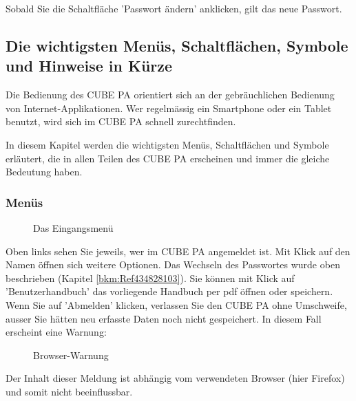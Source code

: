 Sobald Sie die Schaltfläche 'Passwort ändern' anklicken, gilt das neue Passwort.

\subsection{Die wichtigsten Menüs, Schaltflächen, Symbole und Hinweise in Kürze}

Die Bedienung des CUBE PA orientiert sich an der gebräuchlichen Bedienung von Internet-Applikationen. Wer regelmässig ein Smartphone oder ein Tablet benutzt, wird sich im CUBE PA schnell zurechtfinden.

\vspace{\baselineskip}

In diesem Kapitel werden die wichtigsten Menüs, Schaltflächen und Symbole erläutert, die in allen Teilen des CUBE PA erscheinen und immer die gleiche Bedeutung haben.

\subsubsection{Menüs}

\begin{figure}[H]
\caption{Das Eingangsmenü}
\end{figure}


Oben links sehen Sie jeweils, wer im CUBE PA angemeldet ist. Mit Klick auf den Namen öffnen sich weitere Optionen. Das Wechseln des Passwortes wurde oben beschrieben (Kapitel \ref{bkm:Ref434828103}). 
Sie können mit Klick auf 'Benutzerhandbuch' das vorliegende Handbuch per pdf öffnen oder speichern. Wenn Sie auf 'Abmelden' klicken, verlassen Sie den CUBE PA ohne Umschweife, ausser Sie hätten neu erfasste Daten noch nicht gespeichert. In diesem Fall erscheint eine Warnung:

\begin{figure}[H]
\caption{Browser-Warnung}
\end{figure}
\begin{small}
Der Inhalt dieser Meldung ist abhängig vom verwendeten Browser (hier Firefox) und somit nicht beeinflussbar.
\end{small}

